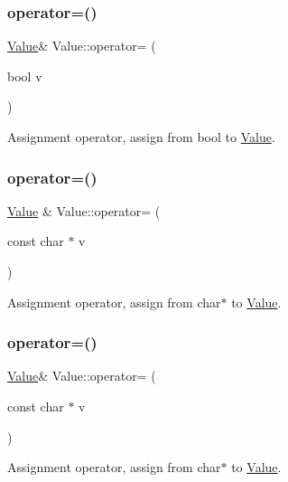\subsubsection{\texorpdfstring{operator=()}{operator=()}\hspace{0.1cm}{\footnotesize\ttfamily [16/32]}}
{\footnotesize\ttfamily \hyperlink{classValue}{Value}\& Value\+::operator= (\begin{DoxyParamCaption}\item[{bool}]{v }\end{DoxyParamCaption})}

Assignment operator, assign from bool to \hyperlink{classValue}{Value}. \mbox{\label{classValue_a44828817011378e6ac08b983f6aa6b7e}} 
\subsubsection{\texorpdfstring{operator=()}{operator=()}\hspace{0.1cm}{\footnotesize\ttfamily [17/32]}}
{\footnotesize\ttfamily \hyperlink{classValue}{Value} \& Value\+::operator= (\begin{DoxyParamCaption}\item[{const char $\ast$}]{v }\end{DoxyParamCaption})}

Assignment operator, assign from char$\ast$ to \hyperlink{classValue}{Value}. \mbox{\label{classValue_ab8021d9bd0a8ea249981189d58f95538}} 
\subsubsection{\texorpdfstring{operator=()}{operator=()}\hspace{0.1cm}{\footnotesize\ttfamily [18/32]}}
{\footnotesize\ttfamily \hyperlink{classValue}{Value}\& Value\+::operator= (\begin{DoxyParamCaption}\item[{const char $\ast$}]{v }\end{DoxyParamCaption})}

Assignment operator, assign from char$\ast$ to \hyperlink{classValue}{Value}. \mbox{\label{classValue_a09862f2666ab6ed3ab70f16f30fb71c4}} 
